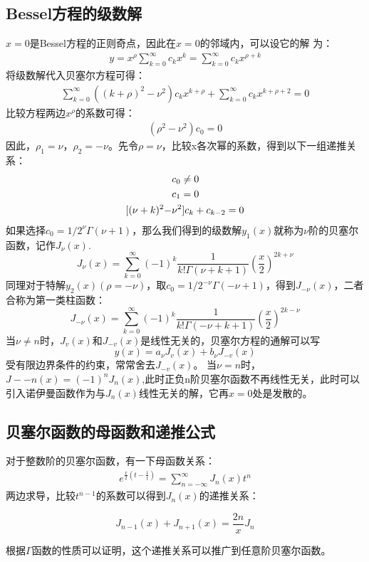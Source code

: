 \documentclass[9pt,a4paper,twoside]{tau-class/tau}
\begin{document}
\subsection{Bessel方程的级数解}
$x=0$是Bessel方程的正则奇点，因此在$x=0$的邻域内，可以设它的解 \cite{MathPhysics}为：
\begin{align}
	y=x^{\rho}\sum_{k=0}^{\infty}c_kx^k=\sum_{k=0}^{\infty}c_kx^{\rho+k}
\end{align}
将级数解代入贝塞尔方程可得：
\begin{align}
	\sum_{k=0}^{\infty}((k+\rho)^2-\nu^2)c_kx^{k+\rho}+\sum_{k=0}^{\infty}c_kx^{k+\rho+2}=0
\end{align}
比较方程两边$x^{\rho}$的系数可得：
\begin{align}
	(\rho^2-\nu^2)c_0=0
\end{align}
因此，$\rho_1=\nu$，$\rho_2=-\nu$。先令$\rho=\nu$，比较x各次幂的系数，得到以下一组递推关系：
	\begin{equation}
		\begin{aligned}
			&c_0\neq 0\notag\\
			&c_1=0\notag\\
			[(\nu+k)^2-&\nu^2]c_k+c_{k-2}=0
		\end{aligned}
	\end{equation}
如果选择$c_0=1/2^{\nu}\Gamma(\nu+1)$，那么我们得到的级数解$y_1(x)$就称为$\nu$阶的贝塞尔函数，记作$J_{\nu}(x)$.
\begin{equation}
	J_{\nu}(x)=\sum_{k=0}^{\infty}(-1)^k\frac{1}{k!\Gamma(\nu+k+1)}(\frac{x}{2})^{2k+\nu}
\end{equation}
同理对于特解$y_2(x)(\rho=-\nu)$，取$c_0=1/2^{-\nu}\Gamma(-\nu+1)$，得到$J_{-\nu}(x)$，二者合称为第一类柱函数：
\begin{equation}
	J_{-\nu}(x)=\sum_{k=0}^{\infty}(-1)^k\frac{1}{k!\Gamma(-\nu+k+1)}(\frac{x}{2})^{2k-\nu}
\end{equation}
当$\nu\neq n$时，$J_v(x)$和$J_{-v}(x)$是线性无关的，贝塞尔方程的通解可以写
\begin{equation}
	y(x)=a_{\nu}J_v(x)+b_{\nu}J_{-v}(x)
\end{equation}
受有限边界条件的约束，常常舍去$J_{-v}(x)$。
当$\nu=n$时，$J-{-n}(x)=(-1)^nJ_n(x)$,此时正负n阶贝塞尔函数不再线性无关，此时可以引入诺伊曼函数作为与$J_n(x)$线性无关的解，它再$x=0$处是发散的。%
\subsection{贝塞尔函数的母函数和递推公式}
对于整数阶的贝塞尔函数，有一下母函数关系：
\begin{align}
	e^{\frac{x}{2}(t-\frac{1}{t})}=\sum_{n=-\infty}^{\infty}J_n(x)t^n
\end{align}
两边求导，比较$t^{n-1}$的系数可以得到$J_n(x)$的递推关系：
\begin{tauenv}[frametitle=递推关系]
	\begin{equation}
		J_{n-1}(x)+J_{n+1}(x)=\frac{2n}{x}J_n
	\end{equation}
\end{tauenv}
根据$\Gamma$函数的性质可以证明，这个递推关系可以推广到任意阶贝塞尔函数。
\end{document}
